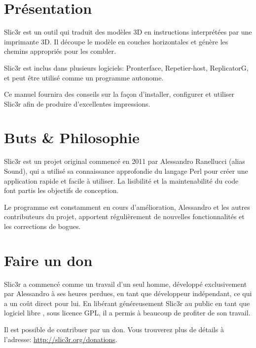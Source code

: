 
\section{Pr\'esentation} %
\label{sec:overview}

Slic3r est un outil qui traduit des mod\`eles 3D en instructions interpr\'et\'ees par une imprimante 3D. Il d\'ecoupe le mod\`ele en couches horizontales et g\'en\`ere les chemins appropri\'es pour les combler.

Slic3r est inclus dans plusieurs logiciels: Pronterface, Repetier-host, ReplicatorG, et peut \^etre utilis\'e comme un programme autonome.

Ce manuel fournira des conseils sur la fa\c{c}on d'installer, configurer et utiliser Slic3r afin de produire d'excellentes impressions.



\section{Buts \& Philosophie} %
\label{sec:goals_philosophy}

Slic3r est un projet original commenc\'e en 2011 par Alessandro Ranellucci (alias Sound), qui a utilis\'e sa connaissance approfondie du langage Perl pour cr\'eer une application rapide et facile \`a utiliser. La lisibilit\'e et la maintenabilit\'e du code font partis les objectifs de conception.

Le programme est constamment en cours d'am\'elioration, Alessandro et les autres contributeurs du projet, apportent r\'eguli\`erement de nouvelles fonctionnalit\'es et les corrections de bogues.



\section{Faire un don} %
\label{sec:donating}

Slic3r a commenc\'e comme un travail d'un seul homme, d\'evelopp\'e exclusivement par Alessandro \`a ses heures perdues, en tant que d\'eveloppeur ind\'ependant, ce qui a un co\^ut direct pour lui. En lib\'erant g\'en\'ereusement Slic3r au public en tant que logiciel libre , sous licence GPL, il a permis \`a beaucoup de profiter de son travail.

Il est possible de contribuer par un don. Vous trouverez plus de d\'etails \`a l'adresse: \url{http://slic3r.org/donations}.


